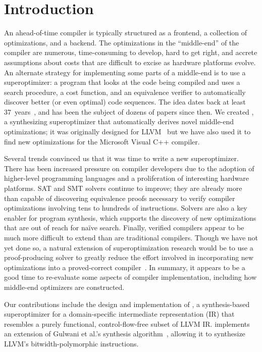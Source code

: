 \section{Introduction}

An ahead-of-time compiler is typically structured as a frontend, a
collection of optimizations, and a backend.
%
The optimizations in the ``middle-end'' of the compiler are numerous,
time-consuming to develop, hard to get right, and accrete assumptions
about costs that are difficult to excise as hardware platforms evolve.
%
An alternate strategy for implementing some parts of a middle-end is
to use a superoptimizer: a program that looks at the code being
compiled and uses a search procedure, a cost function, and an
equivalence verifier to automatically discover better (or even
optimal) code sequences.
%
The idea dates back at least 37~years~\cite{Fraser79}, and has been
the subject of dozens of papers since then.
%
We created \tool, a synthesizing superoptimizer that automatically
derives novel middle-end optimizations; it was originally designed for
LLVM~\cite{Lattner04} but we have also used it to find new
optimizations for the Microsoft Visual C++ compiler.


Several trends convinced us that it was time to write a new
superoptimizer.
%
There has been increased pressure on compiler
developers due to the adoption of higher-level programming languages and a
proliferation of interesting hardware platforms.
%
SAT and SMT solvers continue to improve; they are already more than
capable of discovering equivalence proofs necessary to verify compiler
optimizations involving tens to hundreds of instructions.
%
Solvers are also a key enabler for program synthesis, which supports
the discovery of new optimizations that are out of reach for naïve
search.
%
Finally, verified compilers appear to be much more difficult to extend
than are traditional compilers.
%
Though we have not yet done so, a natural extension of
superoptimization research would be to use a proof-producing solver to
greatly reduce the effort involved in incorporating new optimizations
into a proved-correct compiler~\cite{Leroy09, Mullen16}.
%
In summary, it appears to be a good time to re-evaluate some aspects
of compiler implementation, including how middle-end optimizers are
constructed.


Our contributions include the design and implementation of \tool{}, a
synthesis-based superoptimizer for a domain-specific intermediate
representation (IR) that resembles a purely functional,
control-flow-free subset of LLVM IR\@.
%
\tool{} implements an extension of Gulwani et al.'s synthesis
algorithm~\cite{Gulwani11}, allowing it to synthesize
LLVM's bitwidth-polymorphic instructions.


